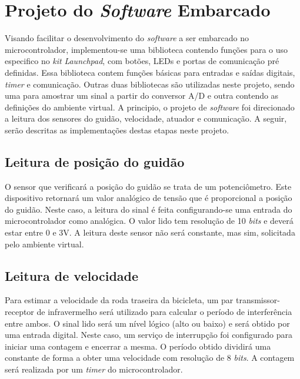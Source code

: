 \section{Projeto do \textit{Software} Embarcado} %
\label{sec:soft_emb}
Visando facilitar o desenvolvimento do \textit{software} a ser embarcado no microcontrolador, implementou-se uma biblioteca contendo funções para o uso especifico no \textit{kit} \textit{Launchpad}, com botões, LEDs e portas de comunicação pré definidas. Essa biblioteca contem funções básicas para entradas e saídas digitais, \textit{timer} e comunicação. Outras duas bibliotecas são utilizadas neste projeto, sendo uma para amostrar um sinal a partir do conversor A/D e outra contendo as definições do ambiente virtual.
A principio, o projeto de \textit{software} foi direcionado a leitura dos sensores do guidão, velocidade, atuador e comunicação. A seguir, serão descritas as implementações destas etapas neste projeto.

\subsection{Leitura de posição do guidão} %
\label{sub:read_guid_sens}
O sensor que verificará a posição do guidão se trata de um potenciômetro. Este dispositivo retornará um valor analógico de tensão que é proporcional a posição do guidão. Neste caso, a leitura do sinal é feita configurando-se uma entrada do microcontrolador como analógica. O valor lido tem resolução de 10 \textit{bits} e deverá estar entre 0 e 3V. A leitura deste sensor não será constante, mas sim, solicitada pelo ambiente virtual.

\subsection{Leitura de velocidade} %
\label{sub:read_vel_sens}

Para estimar a velocidade da roda traseira da bicicleta, um par transmissor-receptor de infravermelho será utilizado para calcular o período de interferência entre ambos. O sinal lido será um nível lógico (alto ou baixo)  e será obtido por uma entrada digital. Neste caso, um serviço de interrupção foi configurado para iniciar uma contagem e encerrar a mesma. O período obtido dividirá uma constante de forma a obter uma velocidade com resolução de 8 \textit{bits}. A contagem será realizada por um \textit{timer} do microcontrolador.

